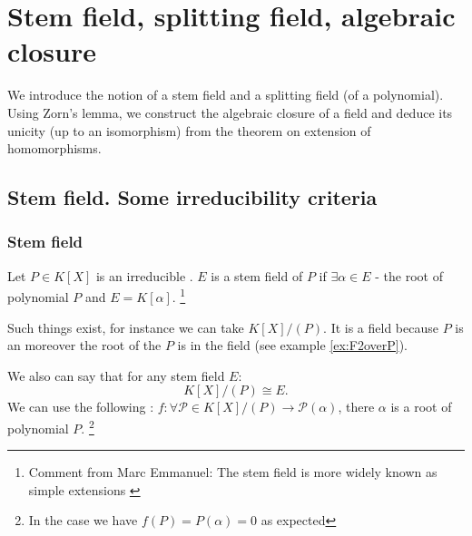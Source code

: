 \chapter{Stem field, splitting field, algebraic closure}
We introduce the notion of a stem field and a splitting field (of a
polynomial). Using Zorn's lemma, we construct the algebraic closure of
a field and deduce its unicity (up to an isomorphism) from the theorem
on extension of homomorphisms.

\section{Stem field. Some irreducibility criteria}

\subsection{Stem field}

\begin{definition}
Let $P \in K\left[X\right]$ is an irreducible
.  $E$ is a stem
field of $P$ if $\exists \alpha \in E$ - the root of polynomial
$P$ and $E = K\left[\alpha\right]$.
\footnote{
  Comment from Marc Emmanuel: The stem field is more widely known as
  simple extensions \cite{wiki:simpleextension}
}
\label{def:stemfield}
\end{definition}

Such things exist, for instance we can take
$K\left[X\right]/\left(P\right)$. It is a field because $P$ is
an  moreover the root of the $P$ is in the
field (see example 
\ref{ex:F2overP}).

We also can say that for any stem field $E$:
\[
K\left[X\right]/\left(P\right) \cong E.
\]
We can use the following :
$f: \forall \mathcal{P} \in K\left[X\right]/\left(P\right) \rightarrow
\mathcal{P}(\alpha)$, there $\alpha$ is a root of polynomial $P$.
\footnote{
  In the case we have $f(P) = P(\alpha) = 0$ as expected
}

